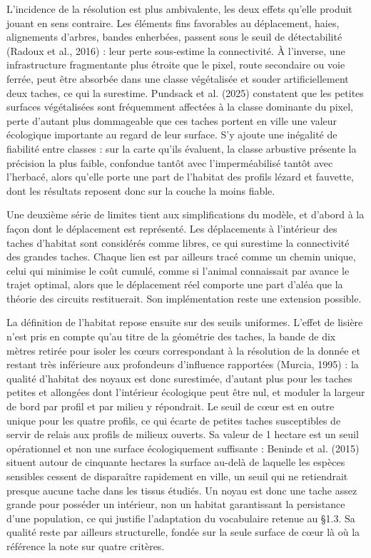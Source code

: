 \documentclass[a4paper,12pt]{report}
\begin{document}
L'incidence de la résolution est plus ambivalente, les deux effets qu'elle produit jouant en sens contraire. Les éléments fins favorables au déplacement, haies, alignements d'arbres, bandes enherbées, passent sous le seuil de détectabilité (Radoux et al., 2016) : leur perte sous-estime la connectivité. À l'inverse, une infrastructure fragmentante plus étroite que le pixel, route secondaire ou voie ferrée, peut être absorbée dans une classe végétalisée et souder artificiellement deux taches, ce qui la surestime. Pundsack et al. (2025) constatent que les petites surfaces végétalisées sont fréquemment affectées à la classe dominante du pixel, perte d'autant plus dommageable que ces taches portent en ville une valeur écologique importante au regard de leur surface. S'y ajoute une inégalité de fiabilité entre classes : sur la carte qu'ils évaluent, la classe arbustive présente la précision la plus faible, confondue tantôt avec l'imperméabilisé tantôt avec l'herbacé, alors qu'elle porte une part de l'habitat des profils lézard et fauvette, dont les résultats reposent donc sur la couche la moins fiable.
 
Une deuxième série de limites tient aux simplifications du modèle, et d'abord à la façon dont le déplacement est représenté. Les déplacements à l'intérieur des taches d'habitat sont considérés comme libres, ce qui surestime la connectivité des grandes taches. Chaque lien est par ailleurs tracé comme un chemin unique, celui qui minimise le coût cumulé, comme si l'animal connaissait par avance le trajet optimal, alors que le déplacement réel comporte une part d'aléa que la théorie des circuits restituerait. Son implémentation reste une extension possible.
 
La définition de l'habitat repose ensuite sur des seuils uniformes. L'effet de lisière n'est pris en compte qu'au titre de la géométrie des taches, la bande de dix mètres retirée pour isoler les cœurs correspondant à la résolution de la donnée et restant très inférieure aux profondeurs d'influence rapportées (Murcia, 1995) : la qualité d'habitat des noyaux est donc surestimée, d'autant plus pour les taches petites et allongées dont l'intérieur écologique peut être nul, et moduler la largeur de bord par profil et par milieu y répondrait. Le seuil de cœur est en outre unique pour les quatre profils, ce qui écarte de petites taches susceptibles de servir de relais aux profils de milieux ouverts. Sa valeur de 1 hectare est un seuil opérationnel et non une surface écologiquement suffisante : Beninde et al. (2015) situent autour de cinquante hectares la surface au-delà de laquelle les espèces sensibles cessent de disparaître rapidement en ville, un seuil qui ne retiendrait presque aucune tache dans les tissus étudiés. Un noyau est donc une tache assez grande pour posséder un intérieur, non un habitat garantissant la persistance d'une population, ce qui justifie l'adaptation du vocabulaire retenue au §1.3. Sa qualité reste par ailleurs structurelle, fondée sur la seule surface de cœur là où la référence la note sur quatre critères.
 
\end{document}
